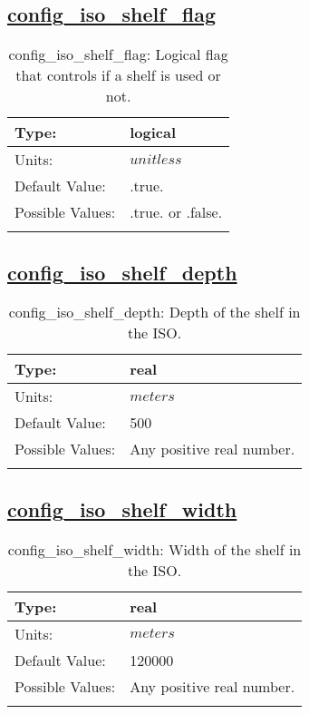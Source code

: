 \subsection[config\_iso\_shelf\_flag]{\hyperref[sec:nm_tab_iso]{config\_iso\_shelf\_flag}}
\label{subsec:nm_sec_config_iso_shelf_flag}
\begin{center}
\begin{longtable}{| p{2.0in} || p{4.0in} |}
    \hline
    Type: & logical \\
    \hline
    Units: & $unitless$ \\
    \hline
    Default Value: & .true. \\
    \hline
    Possible Values: & .true. or .false. \\
    \hline
    \caption{config\_iso\_shelf\_flag: Logical flag that controls if a shelf is used or not.}
\end{longtable}
\end{center}
\subsection[config\_iso\_shelf\_depth]{\hyperref[sec:nm_tab_iso]{config\_iso\_shelf\_depth}}
\label{subsec:nm_sec_config_iso_shelf_depth}
\begin{center}
\begin{longtable}{| p{2.0in} || p{4.0in} |}
    \hline
    Type: & real \\
    \hline
    Units: & $meters$ \\
    \hline
    Default Value: & 500 \\
    \hline
    Possible Values: & Any positive real number. \\
    \hline
    \caption{config\_iso\_shelf\_depth: Depth of the shelf in the ISO.}
\end{longtable}
\end{center}
\subsection[config\_iso\_shelf\_width]{\hyperref[sec:nm_tab_iso]{config\_iso\_shelf\_width}}
\label{subsec:nm_sec_config_iso_shelf_width}
\begin{center}
\begin{longtable}{| p{2.0in} || p{4.0in} |}
    \hline
    Type: & real \\
    \hline
    Units: & $meters$ \\
    \hline
    Default Value: & 120000 \\
    \hline
    Possible Values: & Any positive real number. \\
    \hline
    \caption{config\_iso\_shelf\_width: Width of the shelf in the ISO.}
\end{longtable}
\end{center}
